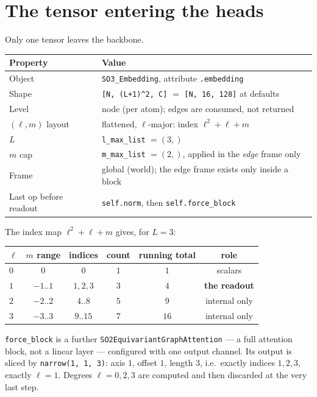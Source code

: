 \documentclass[11pt,a4paper]{report}
\theoremstyle{definition}
\theoremstyle{remark}
\newcommand{\pyfunc}[1]{\texttt{#1}}
\newcommand{\shape}[1]{\texttt{[#1]}}
\begin{document}
\section{The tensor entering the heads}
\label{sec:heads-input}

Only one tensor leaves the backbone.

\begin{center}
\begin{tabular}{ll}
\toprule
Property & Value \\
\midrule
Object & \pyfunc{SO3\_Embedding}, attribute \texttt{.embedding} \\
Shape & \shape{N, (L+1)\textasciicircum 2, C} $=$ \shape{N, 16, 128} at defaults \\
Level & node (per atom); edges are consumed, not returned \\
$(\ell,m)$ layout & flattened, $\ell$-major: index $\ell^2+\ell+m$ \\
$L$ & \texttt{l\_max\_list} $=(3,)$ \\
$m$ cap & \texttt{m\_max\_list} $=(2,)$, applied in the \emph{edge} frame only \\
Frame & global (world); the edge frame exists only inside a block \\
Last op before readout & \pyfunc{self.norm}, then \pyfunc{self.force\_block} \\
\bottomrule
\end{tabular}
\end{center}

The index map $\ell^2+\ell+m$ gives, for $L=3$:

\begin{center}
\begin{tabular}{lccccc}
\toprule
$\ell$ & $m$ range & indices & count & running total & role \\
\midrule
$0$ & $0$ & $0$ & $1$ & $1$ & scalars \\
$1$ & $-1..1$ & $1,2,3$ & $3$ & $4$ & \textbf{the readout} \\
$2$ & $-2..2$ & $4..8$ & $5$ & $9$ & internal only \\
$3$ & $-3..3$ & $9..15$ & $7$ & $16$ & internal only \\
\bottomrule
\end{tabular}
\end{center}

\pyfunc{force\_block} is a further \pyfunc{SO2EquivariantGraphAttention}
--- a full attention block, not a linear layer --- configured with one output
channel. Its output is sliced by \texttt{narrow(1, 1, 3)}: axis $1$, offset
$1$, length $3$, i.e.\ exactly indices $1,2,3$, exactly $\ell=1$. Degrees
$\ell=0,2,3$ are computed and then discarded at the very last step.
\end{document}
